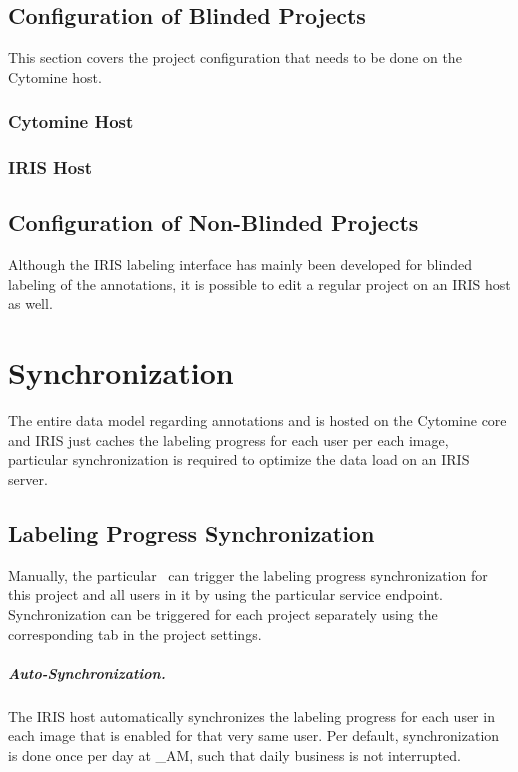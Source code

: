 \section{Configuration of Blinded Projects}
This section covers the project configuration that needs to be done on the Cytomine host. 

\subsection{Cytomine Host}

\subsection{IRIS Host}


\section{Configuration of Non-Blinded Projects}
Although the IRIS labeling interface has mainly been developed for blinded labeling of the annotations, it is possible to edit a regular project on an IRIS host as well. 




\chapter{Synchronization}
The entire data model regarding annotations and is hosted on the Cytomine core and IRIS just caches the labeling progress for each user per each image, particular synchronization is required to optimize the data load on an IRIS server. 

\section{Labeling Progress Synchronization}
Manually, the particular \pjcoord\ can trigger the labeling progress synchronization for this project and all users in it by using the particular service endpoint. 
Synchronization can be triggered for each project separately using the corresponding tab in the project settings. 

\tobedone

\paragraph{Auto-Synchronization.}
The IRIS host automatically synchronizes the labeling progress for each user in each image that is enabled for that very same user. 
Per default, synchronization is done once per day at \_AM, such that daily business is not interrupted. 





